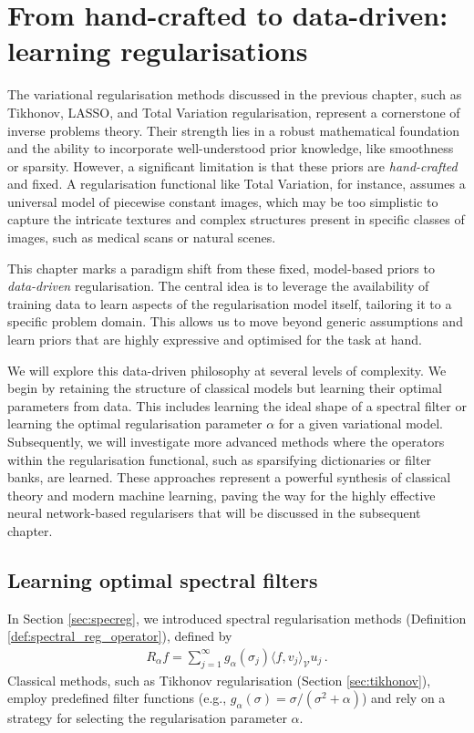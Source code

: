 \chapter{From hand-crafted to data-driven: learning regularisations}\label{ch:data-driven}

The variational regularisation methods discussed in the previous chapter, such as Tikhonov, LASSO, and Total Variation regularisation, represent a cornerstone of inverse problems theory. Their strength lies in a robust mathematical foundation and the ability to incorporate well-understood prior knowledge, like smoothness or sparsity. However, a significant limitation is that these priors are \emph{hand-crafted} and fixed. A regularisation functional like Total Variation, for instance, assumes a universal model of piecewise constant images, which may be too simplistic to capture the intricate textures and complex structures present in specific classes of images, such as medical scans or natural scenes.

This chapter marks a paradigm shift from these fixed, model-based priors to \emph{data-driven} regularisation. The central idea is to leverage the availability of training data to learn aspects of the regularisation model itself, tailoring it to a specific problem domain. This allows us to move beyond generic assumptions and learn priors that are highly expressive and optimised for the task at hand.

We will explore this data-driven philosophy at several levels of complexity. We begin by retaining the structure of classical models but learning their optimal parameters from data. This includes learning the ideal shape of a spectral filter or learning the optimal regularisation parameter $\alpha$ for a given variational model. Subsequently, we will investigate more advanced methods where the operators within the regularisation functional, such as sparsifying dictionaries or filter banks, are learned. These approaches represent a powerful synthesis of classical theory and modern machine learning, paving the way for the highly effective neural network-based regularisers that will be discussed in the subsequent chapter.

\section{Learning optimal spectral filters}

In Section \ref{sec:specreg}, we introduced spectral regularisation methods (Definition \ref{def:spectral_reg_operator}), defined by
\begin{align*}
R_\alpha f = \sum_{j=1}^\infty g_\alpha(\sigma_j) \langle f, v_j \rangle_{\mathcal{V}} u_j \, .
\end{align*}
Classical methods, such as Tikhonov regularisation (Section \ref{sec:tikhonov}), employ predefined filter functions (e.g., $g_\alpha(\sigma) = \sigma/(\sigma^2 + \alpha)$) and rely on a strategy for selecting the regularisation parameter $\alpha$.

